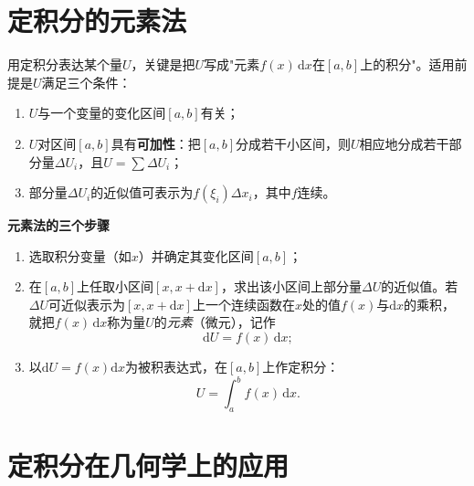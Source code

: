 
\section{定积分的元素法}

用定积分表达某个量$U$，关键是把$U$写成"元素$f(x)\,\mathrm{d}x$在$[a,b]$上的积分"。适用前提是$U$满足三个条件：
\begin{enumerate}
  \item $U$与一个变量的变化区间$[a,b]$有关；
  \item $U$对区间$[a,b]$具有\textbf{可加性}：把$[a,b]$分成若干小区间，则$U$相应地分成若干部分量$\Delta U_i$，且$U=\sum\Delta U_i$；
  \item 部分量$\Delta U_i$的近似值可表示为$f(\xi_i)\Delta x_i$，其中$f$连续。
\end{enumerate}

\noindent\textbf{元素法的三个步骤}
\begin{enumerate}
  \item 选取积分变量（如$x$）并确定其变化区间$[a,b]$；
  \item 在$[a,b]$上任取小区间$[x,x+\mathrm{d}x]$，求出该小区间上部分量$\Delta U$的近似值。若$\Delta U$可近似表示为$[x,x+\mathrm{d}x]$上一个连续函数在$x$处的值$f(x)$与$\mathrm{d}x$的乘积，就把$f(x)\,\mathrm{d}x$称为量$U$的\emph{元素}（微元），记作
\[
\mathrm{d}U=f(x)\,\mathrm{d}x ;
\]
  \item 以$\mathrm{d}U=f(x)\mathrm{d}x$为被积表达式，在$[a,b]$上作定积分：
\[
U=\int_a^bf(x)\,\mathrm{d}x .
\]
\end{enumerate}



\section{定积分在几何学上的应用}

